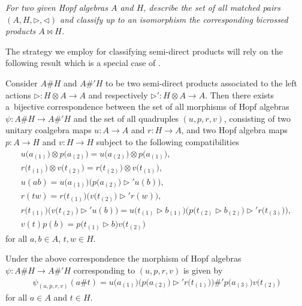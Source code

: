 \textit{For two given Hopf algebras $A$ and $H$, describe the set of all matched pairs $(A, H, \triangleright, \triangleleft)$ and classify
up to an isomorphism the corresponding bicrossed products $A \bowtie H$.}

The strategy we employ for classifying semi-direct products will rely on the following result which is a special case of \cite[Corollary~3.3]{abm}.

\begin{Theorem}\label{toatemorf}
Consider $A \# H$ and $A \#' H$ to be two semi-direct products associated to the left actions $\triangleright \colon H\otimes A \to A$ and
respectively $\triangleright' \colon H\otimes A \to A$. Then there exists a~bijective correspondence between the set of all morphisms of Hopf
algebras $\psi \colon A \# H \to A \# ' H $ and the set of all quadruples $(u, p, r, v)$, consisting of two unitary coalgebra maps $u\colon A \to A$ and $r\colon H \rightarrow A$, and two Hopf algebra maps $p\colon A \to H$ and $v\colon H \rightarrow H$ subject to the following compatibilities
\begin{gather}
u\big(a_{(1)}\big) \otimes p\big(a_{(2)}\big) = u\big(a_{(2)}\big) \otimes p\big(a_{(1)}\big),\label{C1}\\
r\big(t_{(1)}\big) \otimes v\big(t_{(2)}\big) = r\big(t_{(2)}\big) \otimes v\big(t_{(1)}\big),\label{C2}\\
u(ab) = u\big(a_{(1)}\big) \big( p \big(a_{(2)}\big) \triangleright' u(b) \big),\label{C3}\\
r(tw) = r\big(t_{(1)}\big) \big(v\big(t_{(2)}\big) \triangleright' r(w)\big),\label{C4}\\
r\big(t_{(1)}\big) \big(v\big(t_{(2)}\big) \triangleright' u(b) \big) = u \big(t_{(1)} \triangleright b_{(1)}\big) \big( p \big(t_{(2)}
\triangleright b_{(2)}\big) \triangleright' r\big(t_{(3)}\big) \big) ,\label{C5}\\
v(t) p (b)= p \big(t_{(1)} \triangleright b\big) v \big(t_{(2)}\big)\label{C6}
\end{gather}
for all $a, b \in A$, $t, w \in H$.

Under the above correspondence the morphism of Hopf algebras $\psi\colon A \# H \to A \# ' H $ corresponding to $(u, p, r, v)$ is given by
\begin{gather*}%
\psi_{(u, p,r, v)}(a \# t) = u\big(a_{(1)}\big) \big( p\big(a_{(2)}\big) \triangleright' r\big(t_{(1)}\big) \big) \#' p\big(a_{(3)}\big) v\big(t_{(2)}\big)
\end{gather*}
for all $a \in A$ and $t\in H$.
\end{Theorem}

